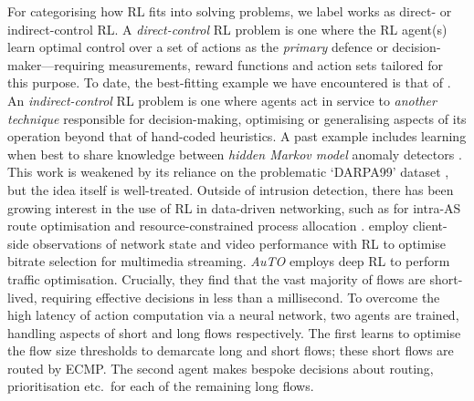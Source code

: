 \documentclass[10pt, times, comsoc]{IEEEtran}
\begin{document}
For categorising how RL fits into solving problems, we label works as direct- or indirect-control RL.
A \emph{direct-control} RL problem is one where the RL agent(s) learn optimal control over a set of actions as the \emph{primary} defence or decision-maker---requiring measurements, reward functions and action sets tailored for this purpose.
To date, the best-fitting example we have encountered is that of \textcite{DBLP:journals/eaai/MalialisK15}.
An \emph{indirect-control} RL problem is one where agents act in service to \emph{another technique} responsible for decision-making, optimising or generalising aspects of its operation beyond that of hand-coded heuristics.
A past example includes learning when best to share knowledge between \emph{hidden Markov model} anomaly detectors \cite{DBLP:conf/paisi/XuSH07}.
This work is weakened by its reliance on the problematic `DARPA99' dataset \cite{DBLP:conf/sp/SommerP10}, but the idea itself is well-treated.
Outside of intrusion detection, there has been growing interest in the use of RL in data-driven networking, such as for intra-AS route optimisation \cite{DBLP:conf/hotnets/ValadarskySST17} and resource-constrained process allocation \cite{DBLP:conf/hotnets/MaoAMK16}.
\textcite{DBLP:conf/sigcomm/MaoNA17} employ client-side observations of network state and video performance with RL to optimise bitrate selection for multimedia streaming.
\emph{AuTO} \cite{DBLP:conf/sigcomm/ChenL0L18} employs deep RL to perform traffic optimisation.
Crucially, they find that the vast majority of flows are short-lived, requiring effective decisions in less than a millisecond.
To overcome the high latency of action computation via a neural network, two agents are trained, handling aspects of short and long flows respectively.
The first learns to optimise the flow size thresholds to demarcate long and short flows; these short flows are routed by ECMP.
The second agent makes bespoke decisions about routing, prioritisation etc.\ for each of the remaining long flows.

\end{document}
